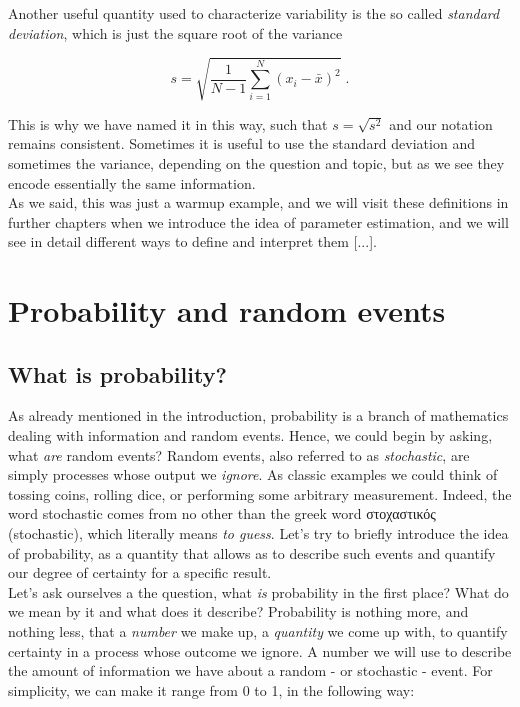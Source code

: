 \documentclass{book}
\begin{document}
Another useful quantity used to characterize variability is the so called \textit{standard deviation}, which is just the square root of the variance

\begin{equation}
s = \sqrt{\frac{1}{N - 1} \sum_{i = 1}^{N} (x_{i} - \bar{x})^{2}} \; . 
\end{equation}

This is why we have named it in this way, such that $s = \sqrt{s^{2}}$ and our notation remains consistent. Sometimes it is useful to use the standard deviation and sometimes the variance, depending on the question and topic, but as we see they encode essentially the same information.\\

As we said, this was just a warmup example, and we will visit these definitions in further chapters when we introduce the idea of parameter estimation, and we will see in detail different ways to define and interpret them [...]. \\


\chapter{Probability and random events}

\section{What is probability?}

As already mentioned in the introduction, probability is a branch of mathematics dealing with information and random events. Hence, we could begin by asking, what \textit{are} random events? Random events, also referred to as \textit{stochastic}, are simply processes whose output we \textit{ignore}. As classic examples we could think of tossing coins, rolling dice, or performing some arbitrary measurement. Indeed, the word stochastic comes from no other than the greek word \textgreek{στοχαστικός} (stochastic), which literally means \textit{to guess}. Let's try to briefly introduce the idea of probability, as a quantity that allows as to describe such events and quantify our degree of certainty for a specific result.\\

Let's ask ourselves a the question, what \textit{is} probability in the first place? What do we mean by it and what does it describe? Probability is nothing more, and nothing less, that a \textit{number} we make up, a \textit{quantity} we come up with, to quantify certainty in a process whose outcome we ignore. A number we will use to describe the amount of information we have about a random - or stochastic - event. For simplicity, we can make it range from 0 to 1, in the following way:
\end{document}
